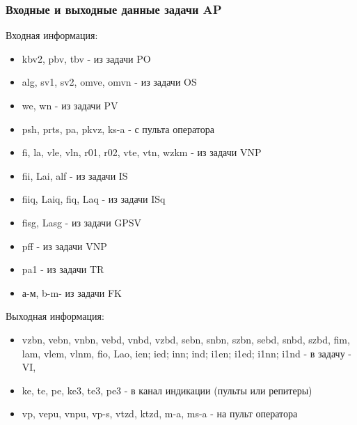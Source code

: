 \subsubsection{Входные и выходные данные задачи AP}
Входная информация:
\begin{itemize}
    \item kbv2,  pbv,  tbv - из задачи  PO
    \item alg, sv1, sv2, omve, omvn - из задачи  OS
    \item we, wn - из задачи  PV
    \item psh, prts, pa, pkvz, ks-a - с пульта оператора
    \item fi,  la, vle, vln, r01, r02,  vte, vtn,  wzkm - из задачи  VNP
    \item fii,  Lai, alf - из задачи  IS
    \item fiiq,  Laiq, fiq,  Laq - из задачи  ISq
    \item fisg,  Lasg - из задачи  GPSV
    \item pff - из задачи  VNP
    \item pa1 - из задачи  TR 
    \item а-м, b-m- из задачи  FK
\end{itemize}
Выходная информация:
\begin{itemize}
 \item vzbn, vebn, vnbn, vebd, vnbd, vzbd, sebn, snbn, szbn, sebd, snbd, szbd, fim, lam, vlem, vlnm,  fio,  Lao, ien;  ied;  inn;  
 ind;  i1en;  i1ed;  i1nn;  i1nd  - в задачу - VI,
 \item ke, te, pe, ke3, te3, pe3 - в  канал индикации (пульты  или репитеры)
 \item vp, vepu, vnpu, vp-s, vtzd,  ktzd, m-a, ms-a -  на пульт оператора
\end{itemize}
